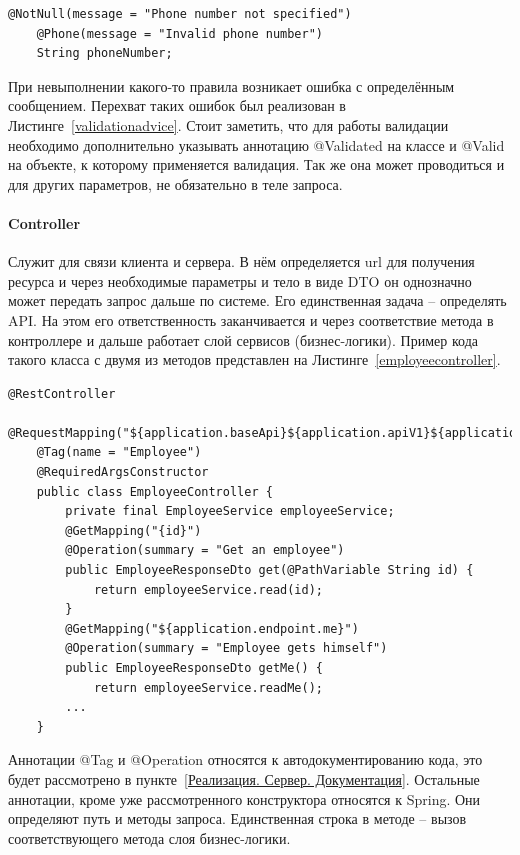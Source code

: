 \documentclass[a4paper,article]{article}
\begin{document}
    \begin{lstlisting}[label=validation,caption=Пример валидации]
    @NotNull(message = "Phone number not specified")
    @Phone(message = "Invalid phone number")
    String phoneNumber;
    \end{lstlisting}
    
    При невыполнении какого-то правила возникает ошибка с определённым сообщением. Перехват таких ошибок был реализован в Листинге~\ref{validationadvice}. Стоит заметить, что для работы валидации необходимо дополнительно указывать аннотацию @Validated на классе и @Valid на объекте, к которому применяется валидация. Так же она может проводиться и для других параметров, не обязательно в теле запроса.
    
    \paragraph{Controller}\label{Реализация. Сервер. Controller}
    
    Служит для связи клиента и сервера. В нём определяется url для получения ресурса и через необходимые параметры и тело в виде DTO он однозначно может передать запрос дальше по системе. Его единственная задача -- определять API. На этом его ответственность заканчивается и через соответствие метода в контроллере и дальше работает слой сервисов (бизнес-логики). Пример кода такого класса с двумя из методов представлен на Листинге~\ref{employeecontroller}.
    
    \begin{lstlisting}[label=employeecontroller,caption=Пример класса слоя представления]
    @RestController
    @RequestMapping("${application.baseApi}${application.apiV1}${application.endpoint.employees}")
    @Tag(name = "Employee")
    @RequiredArgsConstructor
    public class EmployeeController {
        private final EmployeeService employeeService;
        @GetMapping("{id}")
        @Operation(summary = "Get an employee")
        public EmployeeResponseDto get(@PathVariable String id) {
            return employeeService.read(id);
        }
        @GetMapping("${application.endpoint.me}")
        @Operation(summary = "Employee gets himself")
        public EmployeeResponseDto getMe() {
            return employeeService.readMe();
        ...
    }
    \end{lstlisting}
    
    Аннотации @Tag и @Operation относятся к автодокументированию кода, это будет рассмотрено в пункте~\ref{Реализация. Сервер. Документация}. Остальные аннотации, кроме уже рассмотренного конструктора относятся к Spring. Они определяют путь и методы запроса. Единственная строка в методе -- вызов соответствующего метода слоя бизнес-логики.
    
\end{document}
